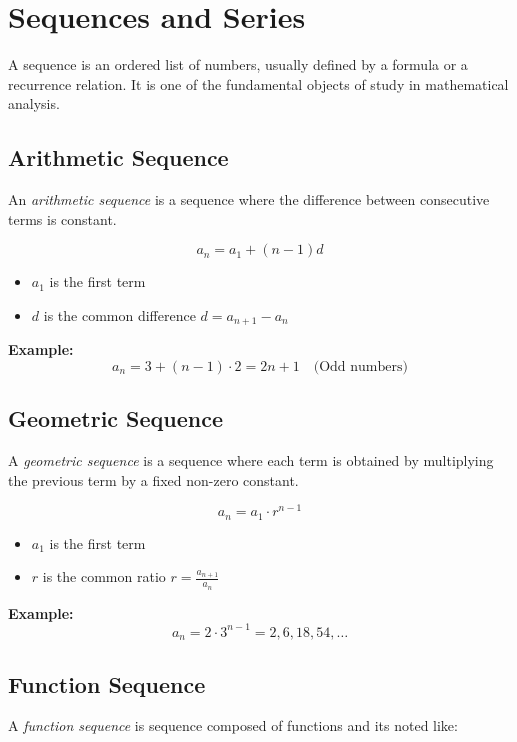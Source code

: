 \section{Sequences and Series}

A sequence is an ordered list of numbers, usually defined by a formula or a recurrence relation. It is one of the fundamental objects of study in mathematical analysis.

\subsection{Arithmetic Sequence}

An \emph{arithmetic sequence} is a sequence where the difference between consecutive terms is constant.

\[
a_n = a_1 + (n - 1)d
\]

\begin{itemize}[label=\(-\)]
\item \(a_1\) is the first term
\item \(d\) is the common difference \(d = a_{n + 1} - a_{n}\)
\end{itemize}

\textbf{Example:}
\[
a_n = 3 + (n - 1) \cdot 2 = 2n + 1 \quad \text{(Odd numbers)}
\]

\subsection{Geometric Sequence}

A \emph{geometric sequence} is a sequence where each term is obtained by multiplying the previous term by a fixed non-zero constant.

\[
a_n = a_1 \cdot r^{n-1}
\]

\begin{itemize}[label=\(-\)]
\item \(a_1\) is the first term
\item \(r\) is the common ratio \(r = \frac{a_{n + 1}}{a_n}\)
\end{itemize}

\textbf{Example:}
\[
a_n = 2 \cdot 3^{n-1} = 2, 6, 18, 54, \dots
\]

\subsection{Function Sequence}

A \emph{function sequence} is sequence composed of functions and its noted like:

